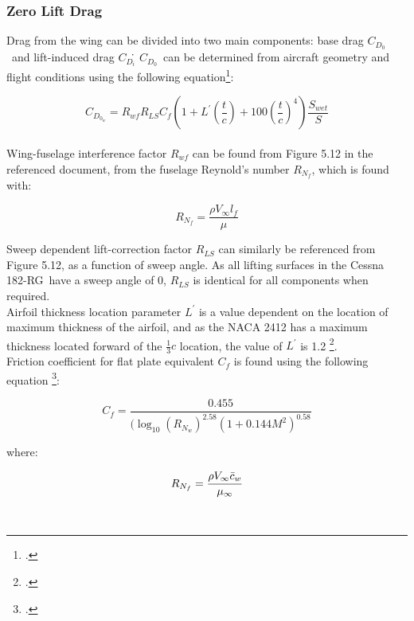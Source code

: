 \documentclass[11pt]{report}
\newcommand{\plane}{Cessna 182-RG}
\newcommand{\cdo}{$C_{D_0}$}
\newcommand{\cdi}{$C_{D_i}$}
\begin{document}
\subsubsection{Zero Lift Drag}
Drag from the wing can be divided into two main components: base drag \cdo\ and lift-induced drag \cdi\. \cdo\ can be determined from aircraft geometry and flight conditions using the following equation\footcite{roskam}:
    
\begin{equation}
    C_{D_{0_w}} = R_{wf}R_{LS}C_f (1 + L^{'} (\frac{t}{c}) + 100 (\frac{t}{c})^4) \frac{S_{wet}}{S}
\end{equation}\\

\noindent Wing-fuselage interference factor $R_{wf}$ can be found from Figure 5.12 in the referenced document, from the fuselage Reynold's number $R_{N_f}$, which is found with:

\begin{equation}
    R_{N_f} = \frac{\rho V_\infty l_f}{\mu}
\end{equation}

\noindent Sweep dependent lift-correction factor $R_{LS}$ can similarly be referenced from Figure 5.12, as a function of sweep angle. As all lifting surfaces in the \plane\ have a sweep angle of $0$, $R_{LS}$ is identical for all components when required.\\

\noindent Airfoil thickness location parameter $L^{'}$ is a value dependent on the location of maximum thickness of the airfoil, and as the NACA 2412 has a maximum thickness located forward of the $\frac{1}{3}c$ location, the value of $L^{'}$ is 1.2 \footcite{roskam}.\\

\noindent Friction coefficient for flat plate equivalent $C_f$ is found using the following equation \footcite{roskam}:

\begin{equation}\label{eq:basedrag}
    C_f = \frac{0.455}{(\log_{10}(R_{N_w})^{2.58} (1 + 0.144 M^2)^{0.58}}
\end{equation}

\noindent where:

\begin{equation}
    R_{N_f} = \frac{\rho V_\infty \Bar{c}_w}{\mu_\infty}
\end{equation}

\\
\end{document}
